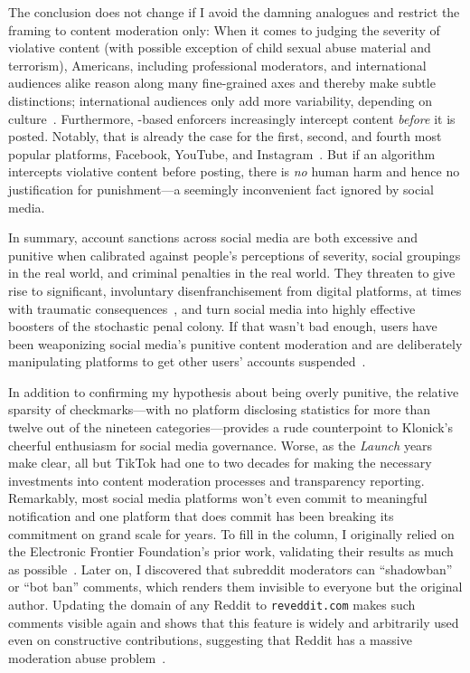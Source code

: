 The conclusion does not change if I avoid the damning analogues and restrict
the framing to content moderation only: When it comes to judging the severity of
violative content (with possible exception of child sexual abuse material and
terrorism), Americans, including professional moderators, and international
audiences alike reason along many fine-grained axes and thereby make subtle
distinctions; international audiences only add more variability, depending on
culture~\cite{JiangScheuermanea2021,ScheuermanJiangea2021}. Furthermore,
-based enforcers increasingly intercept content \emph{before} it is posted.
Notably, that is already the case for the first, second, and fourth most popular
platforms, Facebook, YouTube, and Instagram~\cite{Lua2022}. But if an algorithm
intercepts violative content before posting, there is \emph{no} human harm and
hence no justification for punishment---a seemingly inconvenient fact ignored
by social media.

In summary, account sanctions across social media are both excessive and
punitive when calibrated against people's perceptions of severity, social
groupings in the real world, and criminal penalties in the real world. They
threaten to give rise to significant, involuntary disenfranchisement from
digital platforms, at times with traumatic consequences~\cite{Hill2022}, and
turn social media into highly effective boosters of the stochastic penal colony.
If that wasn't bad enough, users have been weaponizing social media's punitive
content moderation and are deliberately manipulating platforms to get other
users' accounts suspended~\cite{SilvermanFortis2023}.

In addition to confirming my hypothesis about being overly punitive, the
relative sparsity of checkmarks---with no platform disclosing statistics for
more than twelve out of the nineteen categories---provides a rude counterpoint
to Klonick's cheerful enthusiasm for social media governance. Worse, as the
\emph{Launch} years make clear, all but TikTok had one to two decades for making
the necessary investments into content moderation processes and transparency
reporting. Remarkably, most social media platforms won't even commit to
meaningful notification and one platform that does commit has been breaking its
commitment on grand scale for years.  To fill in the column, I originally relied
on the Electronic Frontier Foundation's prior work, validating their results as
much as possible~\cite{CrockerGebhartea2019}. Later on, I discovered that
subreddit moderators can ``shadowban'' or ``bot ban'' comments, which renders
them invisible to everyone but the original author. Updating the domain of any
Reddit  to \texttt{reveddit.com} makes such comments visible again and
shows that this feature is widely and arbitrarily used even on constructive
contributions, suggesting that Reddit has a massive moderation abuse
problem~\cite{Hawkins2023}.

